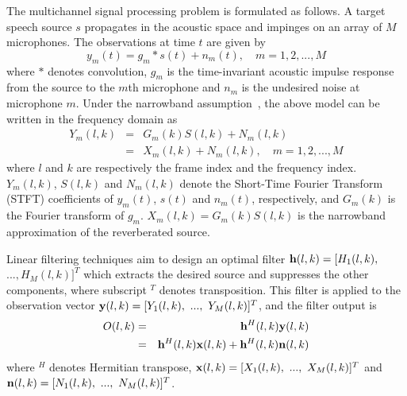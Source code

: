 \documentclass[review]{elsarticle}
\newif\ifproofread
\newcommand{\pfmarker}[1]{%
\ifproofread
\textcolor{red}{#1}%
\else
#1%
\fi
}
\begin{document}
The multichannel signal processing problem is formulated as follows. A target speech source $s$ propagates in the acoustic space and impinges on an array of $M$ microphones. The observations at time $t$ are given by
\begin{equation}\label{eq1}
  y_m(t)=g_m*s(t)+n_m(t), \quad  m=1,2,...,M
\end{equation}
where $*$ denotes convolution, $g_m$ is the time-invariant acoustic impulse response from the source to the $m$th microphone and $n_m$ is the undesired noise at microphone $m$. Under the narrowband assumption~\cite{2016consolidated}, the above model can be written in the frequency domain as
\begin{eqnarray}\label{eq2}
\nonumber Y_m(l,k)&=&G_m(k)S(l,k)+N_m(l,k) \\
&=&X_m(l,k)+N_m(l,k), \quad  m=1,2,...,M
\end{eqnarray}
where $l$ and $k$ are respectively the frame index and the frequency index. $Y_m(l,k)$, $S(l,k)$ and $N_m(l,k)$ denote the Short-Time Fourier Transform (STFT) coefficients of $y_m(t)$, $s(t)$ and $n_m(t)$, respectively, and $G_m(k)$ is the Fourier transform of $g_m$. $X_m(l,k)=G_m(k)S(l,k)$ is the narrowband approximation of the reverberated source.

Linear filtering techniques aim to design an optimal filter ${\bf h}(l,k)=[H_1(l,k),$ $ ..., H_M(l,k)]^T$ which extracts the desired source and suppresses the other components, where subscript ${}^T$ denotes transposition. This filter is applied to the observation vector ${\bf y}(l,k)=[Y_1(l,k),~...,~Y_M(l,k)]^T$, and the filter output is
\begin{eqnarray}
\nonumber  O\pfmarker{(l,k)} &=& {\bf h}^H\pfmarker{(l,k)} {\bf y}\pfmarker{(l,k)} \\
    &=& {\bf h}^H\pfmarker{(l,k)} {\bf x}\pfmarker{(l,k)} + {\bf h}^H\pfmarker{(l,k)} {\bf n}\pfmarker{(l,k)}
\end{eqnarray}
where ${}^H$ denotes Hermitian transpose, ${\bf x}(l,k)=[X_1(l,k),~...,~X_M(l,k)]^T$ and ${\bf n}(l,k)=[N_1(l,k),~...,~N_M(l,k)]^T$.
\end{document}
